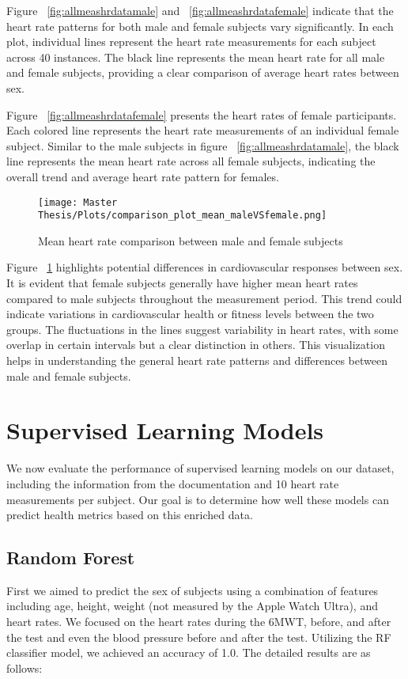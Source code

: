 Figure ~\ref{fig:allmeashrdatamale} and ~\ref{fig:allmeashrdatafemale} indicate that the heart rate patterns for both male and female subjects vary significantly. In each plot, individual lines represent the heart rate measurements for each subject across 40 instances. The black line represents the mean heart rate for all male and female subjects, providing a clear comparison of average heart rates between sex.

Figure ~\ref{fig:allmeashrdatafemale} presents the heart rates of female participants.
Each colored line represents the heart rate measurements of an individual female subject.
Similar to the male subjects in figure ~\ref{fig:allmeashrdatamale}, the black line represents the mean heart rate across all female subjects, indicating the overall trend and average heart rate pattern for females.

\FloatBarrier
\begin{figure}[h!]
  \centering
    \texttt{[image: Master Thesis/Plots/comparison\_plot\_mean\_maleVSfemale.png]}
    \caption{Mean heart rate comparison between male and female subjects}
    \label{fig:avhHRmalefemale}
\end{figure}
\FloatBarrier

Figure ~\ref{fig:avhHRmalefemale} highlights potential differences in cardiovascular responses between sex. It is evident that female subjects generally have higher mean heart rates compared to male subjects throughout the measurement period. This trend could indicate variations in cardiovascular health or fitness levels between the two groups. The fluctuations in the lines suggest variability in heart rates, with some overlap in certain intervals but a clear distinction in others. This visualization helps in understanding the general heart rate patterns and differences between male and female subjects.

\section{Supervised Learning Models}

We now evaluate the performance of supervised learning models on our dataset, including the information from the documentation and 10 heart rate measurements per subject. Our goal is to determine how well these models can predict health metrics based on this enriched data.

\subsection{Random Forest}
First we aimed to predict the sex of subjects using a combination of features including age, height, weight (not measured by the Apple Watch Ultra), and heart rates. We focused on the heart rates during the 6MWT, before, and after the test and even the blood pressure before and after the test. Utilizing the RF classifier model, we achieved an accuracy of 1.0. The detailed results are as follows:

